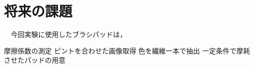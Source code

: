 \documentclass[main]{subfiles}
\begin{document}
\chapter{将来の課題}
　今回実験に使用したブラシパッドは，

摩擦係数の測定
ピントを合わせた画像取得
色を繊維一本で抽出
一定条件で摩耗させたパッドの用意
\end{document}
